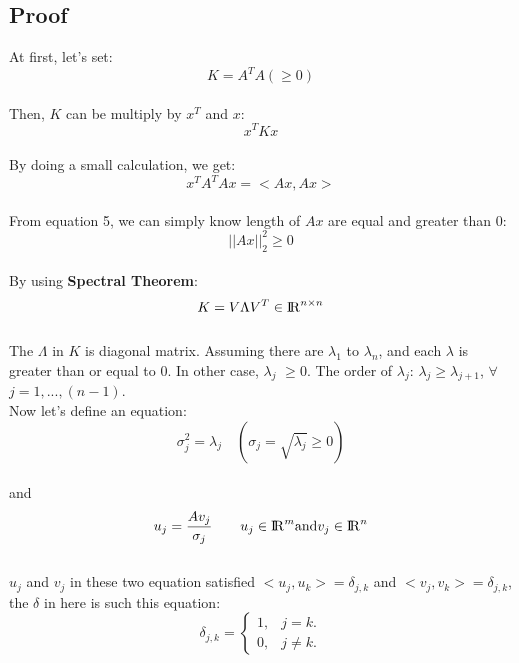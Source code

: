\documentclass{article}
\begin{document}
\subsection{Proof}
At first, let's set:
\begin{equation}
	K = A^T A (\geq 0)
\end{equation}
\\
Then, $K$ can be multiply by $x^T$ and $x$:
\begin{equation}
	x^T K x
\end{equation}
\\
By doing a small calculation, we get:
\begin{equation}
	x^T A^T A x = <Ax, Ax>
\end{equation}
\\
From equation 5, we can simply know length of $Ax$  are equal and  greater than $0$:
\begin{equation}
	||Ax||_2^2 \geq 0
\end{equation}
\\
By using \textbf{Spectral Theorem}:
\begin{equation}
	K = V \Lambda V^T \in {\rm I\!R}^{n \times n}
\end{equation}
\\
The $\Lambda$ in $K$ is diagonal matrix. Assuming there are $\lambda_1$ to $\lambda_n$, and each $\lambda$ is greater than or equal to $0$. In other case, 
$\lambda_j$ 
$\geq 0$.
The order of $\lambda_j$: $\lambda_j \geq \lambda_{j+1}$, 
$\forall$
$j = 1, ... ,(n-1)$.
\\
Now let's define an equation:
\begin{equation}
	\sigma_j^2 = \lambda_j     \quad   (\sigma_j = \sqrt{\lambda_j} \geq 0)
\end{equation}
\\
and
\\
\begin{equation}
	u_j = \frac{A v_j}{\sigma_j} \qquad u_j \in {\rm I\!R}^{m} \mbox{and}  v_j \in {\rm I\!R}^{n}
\end{equation}
\\
$u_j$ and $v_j$ in these two equation satisfied
 $<u_j, u_k> = \delta_{j,k}$ 
 and 
 $<v_j, v_k> = \delta_{j,k}$,
 the $\delta$ in here is such this equation:
\begin{equation}
		\delta_{j,k}=\left\{
		\begin{array}{ll}
			1, & \mbox{$j=k$}.\\
			0, & \mbox{$j \neq k$}.
		\end{array}
		\right.
\end{equation}
\end{document}
